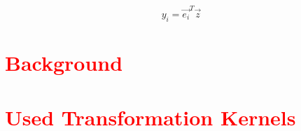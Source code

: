 \begin{equation}
    y_i = \vec{e_i}^T \vec{z}
\end{equation}




\section{\textcolor{red}{Background}}

\section{\textcolor{red}{Used Transformation Kernels}}

\printbibliography[heading=subbibliography]
